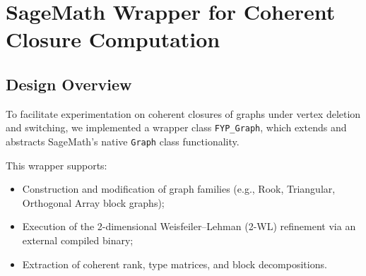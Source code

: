 


\clearpage
\renewcommand{\thepage}{D\arabic{page}}
\setcounter{page}{1}
\section{SageMath Wrapper for Coherent Closure Computation}


\subsection*{Design Overview}
To facilitate experimentation on coherent closures of graphs under vertex deletion and switching, we implemented a wrapper class \texttt{FYP\_Graph}, which extends and abstracts SageMath's native \texttt{Graph} class functionality.

This wrapper supports:
\begin{itemize}
    \item Construction and modification of graph families (e.g., Rook, Triangular, Orthogonal Array block graphs);
    \item Execution of the 2-dimensional Weisfeiler–Lehman (2-WL) refinement via an external compiled binary;
    \item Extraction of coherent rank, type matrices, and block decompositions.
\end{itemize}

